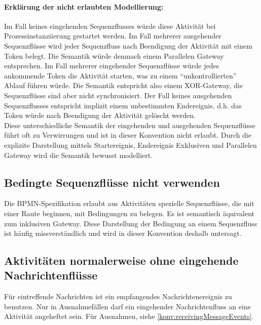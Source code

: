 \documentclass[12pt,report]{../../Templates/snetTeaching}
\begin{document}
\paragraph{Erklärung der nicht erlaubten Modellierung:} Im Fall keines eingehenden Sequenzflusses würde diese Aktivität bei Prozessinstanziierung gestartet werden. 
Im Fall mehrerer ausgehender Sequenzflüsse wird jeder Sequenzfluss nach Beendigung der Aktivität mit einem Token belegt. Die Semantik würde demnach einem Parallelen Gateway entsprechen.
Im Fall mehrerer eingehender Sequenzflüsse würde jedes ankommende Token die Aktivität starten, was zu einem "`unkontrollierten"' Ablauf führen würde. Die Semantik entspricht also einem XOR-Gateway, die Sequenzflüsse sind aber nicht synchronisiert.
Der Fall keines ausgehenden Sequenzflusses entspricht implizit einem unbestimmten Endereignis, d.h. das Token würde nach Beendigung der Aktivität gelöscht werden.\\
Diese unterschiedliche Semantik der eingehenden und ausgehenden Sequenzflüsse führt oft zu Verwirrungen und ist in dieser Konvention nicht erlaubt. Durch die explizite Darstellung mittels Startereignis, Endereignis Exklusiven und Parallelen Gateway wird die Semantik bewusst modelliert.




\newpage
\subsection{Bedingte Sequenzflüsse nicht verwenden}

Die BPMN-Spezifikation erlaubt aus Aktivitäten spezielle Sequenzflüsse, die mit einer Raute beginnen, mit Bedingungen zu belegen. Es ist semantisch äquivalent zum inklusiven Gateway. Diese Darstellung der Bedingung an einem Sequenzfluss ist häufig missverständlich und wird in dieser Konvention deshalb untersagt. 

\begin{Rahmen}
	\hfill
\end{Rahmen}

\subsection{Aktivitäten normalerweise ohne eingehende Nachrichtenflüsse}

Für eintreffende Nachrichten ist ein empfangendes Nachrichtenereignis zu benutzen. Nur in Ausnahmefällen darf ein eingehender Nachrichtenfluss an eine Aktivität angeheftet sein. Für Ausnahmen, siehe \ref{konv:receivingMessageEvents}.
\end{document}
